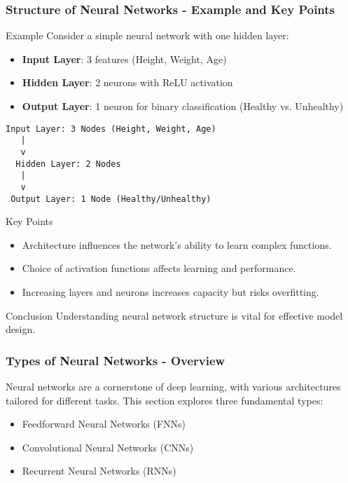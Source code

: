 \documentclass[aspectratio=169]{beamer}
\begin{document}
\begin{frame}[fragile]
    \frametitle{Structure of Neural Networks - Example and Key Points}
    \begin{block}{Example}
        Consider a simple neural network with one hidden layer:
        \begin{itemize}
            \item \textbf{Input Layer}: 3 features (Height, Weight, Age)
            \item \textbf{Hidden Layer}: 2 neurons with ReLU activation
            \item \textbf{Output Layer}: 1 neuron for binary classification (Healthy vs. Unhealthy)
        \end{itemize}
        \begin{center}
            \texttt{Input Layer: 3 Nodes (Height, Weight, Age)\\
                      \quad \quad \ \ \ |\\
                      \quad \quad \ \ \ v\\
                      \quad \ \ Hidden Layer: 2 Nodes\\
                      \quad \quad \ \ \ |\\
                      \quad \quad \ \ \ v\\
                      \quad \ Output Layer: 1 Node (Healthy/Unhealthy)}
        \end{center}
    \end{block}
    
    \begin{block}{Key Points}
        \begin{itemize}
            \item Architecture influences the network's ability to learn complex functions.
            \item Choice of activation functions affects learning and performance.
            \item Increasing layers and neurons increases capacity but risks overfitting.
        \end{itemize}
    \end{block}
    
    \begin{block}{Conclusion}
        Understanding neural network structure is vital for effective model design.
    \end{block}
\end{frame}

\begin{frame}[fragile]
    \frametitle{Types of Neural Networks - Overview}
    Neural networks are a cornerstone of deep learning, with various architectures tailored for different tasks. This section explores three fundamental types:
    \begin{itemize}
        \item Feedforward Neural Networks (FNNs)
        \item Convolutional Neural Networks (CNNs)
        \item Recurrent Neural Networks (RNNs)
    \end{itemize}
\end{frame}
\end{document}
